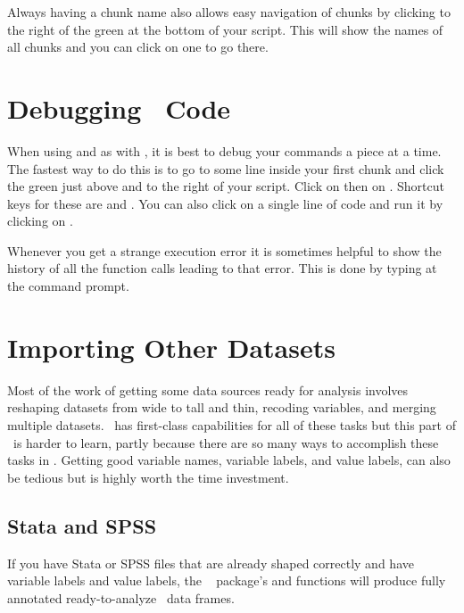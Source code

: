 Always having a chunk name also allows easy navigation of chunks by
clicking to the right of the green  at the bottom of your
script.  This will show the names of all chunks and you can click on
one to go there.

\section{Debugging \R\ Code}
When using  and  as with , it is
best to debug your commands a piece at a time.  The fastest way to do
this is to go to some line inside your first chunk and click the green
 just above and to the right of your script.  Click on  then on .  Shortcut keys for these
are  and .  You can also click on a
single line of code and run it by clicking on .

Whenever you get a strange execution error it is sometimes helpful to
show the history of all the function calls leading to that error.
This is done by typing  at the command prompt.

\section{Importing Other Datasets}\label{sec:r-import}
Most of the work of getting some data sources ready for analysis involves
reshaping datasets from wide to tall and thin, recoding variables,
and merging multiple datasets.  \R\ has first-class capabilities for
all of these tasks but this part of \R\ is harder to learn, partly
because there are so many ways to accomplish these tasks in \R.
Getting good variable names, variable labels, and value labels, can
also be tedious but is highly worth the time investment.

\subsection{Stata and SPSS}
If you have Stata or SPSS files that are
already shaped correctly and have variable labels and value
labels, the \R\  package's  and
 functions will produce fully annotated
ready-to-analyze \R\ data frames.


